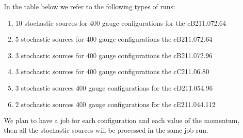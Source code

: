 In the table below we refer to the following types of runs:
\begin{enumerate}
	\item \label{rt:cB48} 10 stochastic sources for 400 gauge configurations for the cB211.072.64
	\item \label{rt:cB64} 5 stochastic sources for 400 gauge configurations the cB211.072.64
	\item \label{rt:cB96} 3 stochastic sources for 400 gauge configurations the cB211.072.96
	\item \label{rt:cC80} 3 stochastic sources for 400 gauge configurations the cC211.06.80
	\item \label{rt:cD96}  3 stochastic sources 400 gauge configurations for the cD211.054.96
	\item  \label{rt:cE112} 2 stochastic sources 400 gauge configurations for the cE211.044.112
\end{enumerate}
We plan to have a job for each configuration and each value of the momentum, then
all the stochastic sources will be processed in the same job run.

